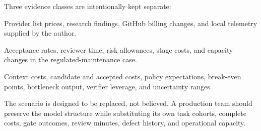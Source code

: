 \documentclass[11pt]{article}
\begin{document}
Three evidence classes are intentionally kept separate:

\begin{description}[style=nextline,leftmargin=3.3cm]
\item[Sourced observations] Provider list prices, research findings, GitHub billing changes, and local telemetry supplied by the author.
\item[Scenario assumptions] Acceptance rates, reviewer time, risk allowances, stage costs, and capacity changes in the regulated-maintenance case.
\item[Calculated results] Context costs, candidate and accepted costs, policy expectations, break-even points, bottleneck output, verifier leverage, and uncertainty ranges.
\end{description}

The scenario is designed to be replaced, not believed. A production team should preserve the model structure while substituting its own task cohorts, complete costs, gate outcomes, review minutes, defect history, and operational capacity.
\end{document}
